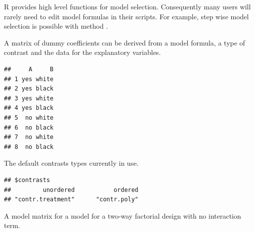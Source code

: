\documentclass[krantz2]{krantz}\usepackage{knitr}%
\begin{document}
\begin{explainbox}
R provides high level functions for model selection. Consequently many \Rlang users will rarely need to edit model formulas in their scripts. For example, step wise model selection is possible with \Rlang method .

A matrix of dummy coefficients can be derived from a model formula, a type of contrast and the data for the explanatory variables.

\begin{knitrout}\footnotesize
{}\color{fgcolor}\begin{kframe}
\begin{alltt}
 \hlkwb{<-} \hlstd{(} \hlstd{=} \hlstd{(}\hlstd{(}\hlstd{,} \hlstd{),} \hlstd{(}\hlstd{,} \hlstd{)),}
                         \hlstd{=} \hlstd{(}\hlstd{(}\hlstd{,} \hlstd{),} \hlstd{))}
\end{alltt}
\begin{verbatim}
##     A     B
## 1 yes white
## 2 yes black
## 3 yes white
## 4 yes black
## 5  no white
## 6  no black
## 7  no white
## 8  no black
\end{verbatim}
\end{kframe}
\end{knitrout}

The default contrasts types currently in use.

\begin{knitrout}\footnotesize
{}\color{fgcolor}\begin{kframe}
\begin{alltt}
\hlstd{(}\hlstd{)}
\end{alltt}
\begin{verbatim}
## $contrasts
##         unordered           ordered 
## "contr.treatment"      "contr.poly"
\end{verbatim}
\end{kframe}
\end{knitrout}

A model matrix for a model for a two-way factorial design with no interaction term.


\end{explainbox}
\end{document}
